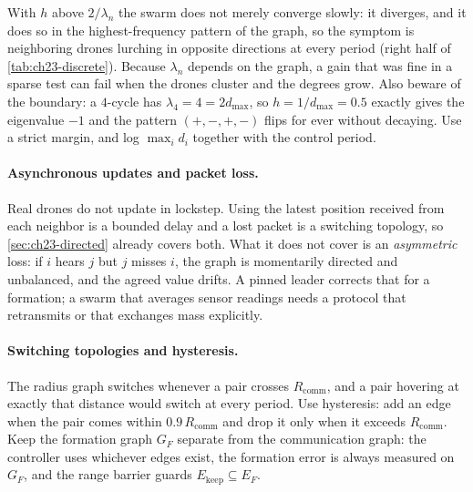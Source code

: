 \begin{pitfall}
With $h$ above $2/\lambda_n$ the swarm does not merely converge slowly: it
diverges, and it does so in the highest-frequency pattern of the graph, so
the symptom is neighboring drones lurching in opposite directions at every
period (right half of \cref{tab:ch23-discrete}). Because $\lambda_n$ depends on
the graph, a gain that was fine in a sparse test can fail when the drones
cluster and the degrees grow. Also beware of the boundary: a $4$-cycle has
$\lambda_4 = 4 = 2d_{\max}$, so $h = 1/d_{\max} = 0.5$ exactly gives the
eigenvalue $-1$ and the pattern $(+,-,+,-)$ flips for ever without decaying.
Use a strict margin, and log $\max_i d_i$ together with the control period.
\end{pitfall}

\paragraph{Asynchronous updates and packet loss.}
Real drones do not update in lockstep. Using the latest position received from
each neighbor is a bounded delay and a lost packet is a switching topology, so
\cref{sec:ch23-directed} already covers both. What it does not cover is an
\emph{asymmetric} loss: if $i$ hears $j$ but $j$ misses $i$, the graph is
momentarily directed and unbalanced, and the agreed value drifts. A pinned
leader corrects that for a formation; a swarm that averages sensor readings
needs a protocol that retransmits or that exchanges mass explicitly.

\paragraph{Switching topologies and hysteresis.}
The radius graph switches whenever a pair crosses $R_{\mathrm{comm}}$, and a
pair hovering at exactly that distance would switch at every period. Use
hysteresis: add an edge when the pair comes within $0.9\,R_{\mathrm{comm}}$
and drop it only when it exceeds $R_{\mathrm{comm}}$. Keep the formation graph
$G_F$ separate from the communication graph: the controller uses whichever
edges exist, the formation error is always measured on $G_F$, and the range
barrier guards $E_{\mathrm{keep}} \subseteq E_F$.

